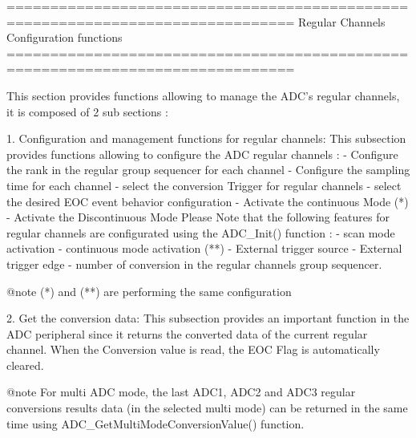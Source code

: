 \begin{DoxyVerb} ===============================================================================
                  Regular Channels Configuration functions
 ===============================================================================  

  This section provides functions allowing to manage the ADC's regular channels,
  it is composed of 2 sub sections : 
  
  1. Configuration and management functions for regular channels: This subsection 
     provides functions allowing to configure the ADC regular channels :    
          - Configure the rank in the regular group sequencer for each channel
          - Configure the sampling time for each channel
          - select the conversion Trigger for regular channels
          - select the desired EOC event behavior configuration
          - Activate the continuous Mode  (*)
          - Activate the Discontinuous Mode 
     Please Note that the following features for regular channels are configurated
     using the ADC_Init() function : 
          - scan mode activation 
          - continuous mode activation (**) 
          - External trigger source  
          - External trigger edge 
          - number of conversion in the regular channels group sequencer.
     
     @note (*) and (**) are performing the same configuration
     
  2. Get the conversion data: This subsection provides an important function in 
     the ADC peripheral since it returns the converted data of the current 
     regular channel. When the Conversion value is read, the EOC Flag is 
     automatically cleared.
     
     @note For multi ADC mode, the last ADC1, ADC2 and ADC3 regular conversions 
           results data (in the selected multi mode) can be returned in the same 
           time using ADC_GetMultiModeConversionValue() function. \end{DoxyVerb}
 

